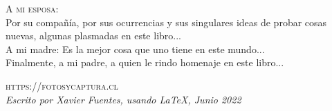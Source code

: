\noindent \textsc{A mi esposa:}\\

\noindent Por su compañía, por sus ocurrencias y sus singulares ideas de probar cosas nuevas, algunas plasmadas en este libro...\\

\noindent A mi madre: Es la mejor cosa que uno tiene en este mundo...\\ 

\noindent Finalmente, a mi padre, a quien le rindo homenaje en este libro...

\noindent \textsc{https://fotosycaptura.cl}\\ %

\noindent \textit{Escrito por Xavier Fuentes, usando \LaTeX, Junio 2022}